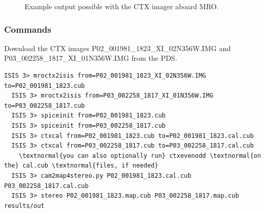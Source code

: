 \begin{figure}[b!]
\centering
  \hfil
\caption{Example output possible with the CTX imager aboard MRO.}
\label{fig:ctx_example}
\end{figure}

\subsubsection*{Commands}

Download the \ac{CTX} images P02\_001981\_1823\_XI\_02N356W.IMG and
P03\_002258\_1817\_XI\_01N356W.IMG from the \ac{PDS}.
\begin{Verbatim}[commandchars=\\\{\}]
  ISIS 3> mroctx2isis from=P02_001981_1823_XI_02N356W.IMG to=P02_001981_1823.cub
  ISIS 3> mroctx2isis from=P03_002258_1817_XI_01N356W.IMG to=P03_002258_1817.cub
  ISIS 3> spiceinit from=P02_001981_1823.cub
  ISIS 3> spiceinit from=P03_002258_1817.cub
  ISIS 3> ctxcal from=P02_001981_1823.cub to=P02_001981_1823.cal.cub
  ISIS 3> ctxcal from=P03_002258_1817.cub to=P03_002258_1817.cal.cub
    \textnormal{you can also optionally run} ctxevenodd \textnormal{on the} cal.cub \textnormal{files, if needed}
  ISIS 3> cam2map4stereo.py P02_001981_1823.cal.cub P03_002258_1817.cal.cub
  ISIS 3> stereo P02_001981_1823.map.cub P03_002258_1817.map.cub results/out
\end{Verbatim}

